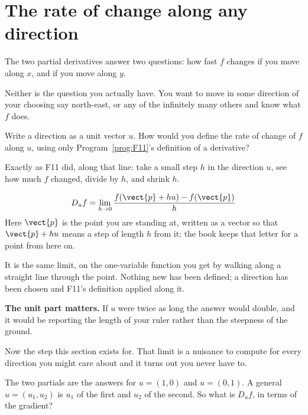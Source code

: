 \section{The rate of change along any direction}
\label{sec:P15-directional}

\begin{fr}
The two partial derivatives answer two questions: how fast $f$ changes if you
move along $x$, and if you move along $y$.

Neither is the question you actually have. You want to move in some direction
of your choosing \dash{} say north-east, or any of the infinitely many others
\dash{} and know what $f$ does.

Write a direction as a unit vector $u$. How would you define the rate of
change of $f$ along $u$, using only Program~\ref{prog:F11}'s definition of a
derivative?
\dotline
\nextframe
\end{fr}

\begin{fr}
\begin{ansblock}
Exactly as F11 did, along that line: take a small step $h$ in the direction
$u$, see how much $f$ changed, divide by $h$, and shrink $h$.
\end{ansblock}

\[ D_u f = \lim_{h \to 0} \frac{f(\vect{p} + h u) - f(\vect{p})}{h} \]
Here $\vect{p}$ is the point you are standing at, written as a vector so that
$\vect{p} + hu$ means a step of length $h$ from it; the book keeps that letter
for a point from here on.

It is the same limit, on the one-variable function you get by walking along a
straight line through the point. Nothing new has been defined; a direction has
been chosen and F11's definition applied along it.

\textbf{The unit part matters.} If $u$ were twice as long the answer would
double, and it would be reporting the length of your ruler rather than the
steepness of the ground.
\end{fr}

\begin{fr}
Now the step this section exists for. That limit is a nuisance to compute for
every direction you might care about \dash{} and it turns out you never have
to.

The two partials are the answers for $u = (1, 0)$ and $u = (0, 1)$. A general
$u = (u_1, u_2)$ is $u_1$ of the first and $u_2$ of the second. So what is
$D_u f$, in terms of the gradient?
\dotline
\nextframe
\end{fr}


